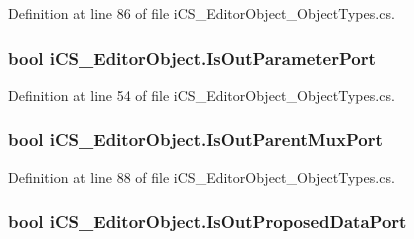 Definition at line 86 of file i\+C\+S\+\_\+\+Editor\+Object\+\_\+\+Object\+Types.\+cs.

\hypertarget{classi_c_s___editor_object_a9aa8589b24b2ea663c5caaddf2cc979f}{
\subsubsection[{Is\+Out\+Parameter\+Port}]{\setlength{\rightskip}{0pt plus 5cm}bool i\+C\+S\+\_\+\+Editor\+Object.\+Is\+Out\+Parameter\+Port\hspace{0.3cm}{\ttfamily [get]}}}\label{classi_c_s___editor_object_a9aa8589b24b2ea663c5caaddf2cc979f}


Definition at line 54 of file i\+C\+S\+\_\+\+Editor\+Object\+\_\+\+Object\+Types.\+cs.

\hypertarget{classi_c_s___editor_object_aea5704e8d2aef51e371754ca24ddc05d}{
\subsubsection[{Is\+Out\+Parent\+Mux\+Port}]{\setlength{\rightskip}{0pt plus 5cm}bool i\+C\+S\+\_\+\+Editor\+Object.\+Is\+Out\+Parent\+Mux\+Port\hspace{0.3cm}{\ttfamily [get]}}}\label{classi_c_s___editor_object_aea5704e8d2aef51e371754ca24ddc05d}


Definition at line 88 of file i\+C\+S\+\_\+\+Editor\+Object\+\_\+\+Object\+Types.\+cs.

\hypertarget{classi_c_s___editor_object_af44f59762d209400c4831c9d12f76597}{
\subsubsection[{Is\+Out\+Proposed\+Data\+Port}]{\setlength{\rightskip}{0pt plus 5cm}bool i\+C\+S\+\_\+\+Editor\+Object.\+Is\+Out\+Proposed\+Data\+Port\hspace{0.3cm}{\ttfamily [get]}}}\label{classi_c_s___editor_object_af44f59762d209400c4831c9d12f76597}


